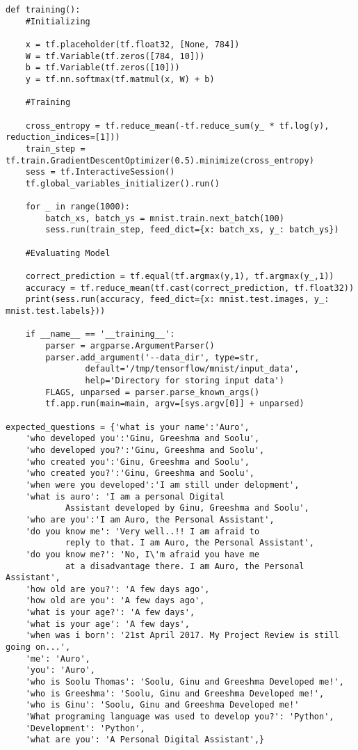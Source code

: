 \begin{lstlisting}
def training():
	#Initializing

	x = tf.placeholder(tf.float32, [None, 784])
	W = tf.Variable(tf.zeros([784, 10]))
	b = tf.Variable(tf.zeros([10]))
	y = tf.nn.softmax(tf.matmul(x, W) + b)

	#Training

	cross_entropy = tf.reduce_mean(-tf.reduce_sum(y_ * tf.log(y), reduction_indices=[1]))
	train_step = tf.train.GradientDescentOptimizer(0.5).minimize(cross_entropy)
	sess = tf.InteractiveSession()
	tf.global_variables_initializer().run()

	for _ in range(1000):
		batch_xs, batch_ys = mnist.train.next_batch(100)
		sess.run(train_step, feed_dict={x: batch_xs, y_: batch_ys})

	#Evaluating Model

	correct_prediction = tf.equal(tf.argmax(y,1), tf.argmax(y_,1))
	accuracy = tf.reduce_mean(tf.cast(correct_prediction, tf.float32))
	print(sess.run(accuracy, feed_dict={x: mnist.test.images, y_: mnist.test.labels}))

	if __name__ == '__training__':
		parser = argparse.ArgumentParser()
		parser.add_argument('--data_dir', type=str, 
				default='/tmp/tensorflow/mnist/input_data',
		        help='Directory for storing input data')
		FLAGS, unparsed = parser.parse_known_args()
		tf.app.run(main=main, argv=[sys.argv[0]] + unparsed)

expected_questions = {'what is your name':'Auro', 
	'who developed you':'Ginu, Greeshma and Soolu',
	'who developed you?':'Ginu, Greeshma and Soolu',
	'who created you':'Ginu, Greeshma and Soolu',
	'who created you?':'Ginu, Greeshma and Soolu',
	'when were you developed':'I am still under delopment', 
	'what is auro': 'I am a personal Digital 
			Assistant developed by Ginu, Greeshma and Soolu', 
	'who are you':'I am Auro, the Personal Assistant',
	'do you know me': 'Very well..!! I am afraid to 
			reply to that. I am Auro, the Personal Assistant',
	'do you know me?': 'No, I\'m afraid you have me
			at a disadvantage there. I am Auro, the Personal Assistant',
	'how old are you?': 'A few days ago',
	'how old are you': 'A few days ago',
	'what is your age?': 'A few days',
	'what is your age': 'A few days',
	'when was i born': '21st April 2017. My Project Review is still going on...',
	'me': 'Auro',
	'you': 'Auro',
	'who is Soolu Thomas': 'Soolu, Ginu and Greeshma Developed me!',
	'who is Greeshma': 'Soolu, Ginu and Greeshma Developed me!',
	'who is Ginu': 'Soolu, Ginu and Greeshma Developed me!'
	'What programing language was used to develop you?': 'Python',
	'Development': 'Python',
	'what are you': 'A Personal Digital Assistant',}



\end{lstlisting}
